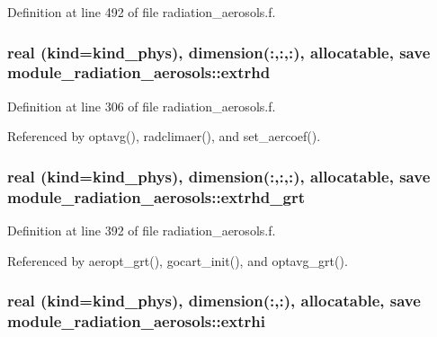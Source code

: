 Definition at line 492 of file radiation\+\_\+aerosols.\+f.

\subsubsection[{\texorpdfstring{extrhd}{extrhd}}]{\setlength{\rightskip}{0pt plus 5cm}real (kind=kind\+\_\+phys), dimension(\+:,\+:,\+:), allocatable, save module\+\_\+radiation\+\_\+aerosols\+::extrhd\hspace{0.3cm}{\ttfamily [private]}}\hypertarget{group__module__radiation__aerosols_ga1c69f7b8ff0c98252e94def83dabfed4}{}\label{group__module__radiation__aerosols_ga1c69f7b8ff0c98252e94def83dabfed4}


Definition at line 306 of file radiation\+\_\+aerosols.\+f.



Referenced by optavg(), radclimaer(), and set\+\_\+aercoef().

\subsubsection[{\texorpdfstring{extrhd\+\_\+grt}{extrhd_grt}}]{\setlength{\rightskip}{0pt plus 5cm}real (kind=kind\+\_\+phys), dimension(\+:,\+:,\+:), allocatable, save module\+\_\+radiation\+\_\+aerosols\+::extrhd\+\_\+grt\hspace{0.3cm}{\ttfamily [private]}}\hypertarget{group__module__radiation__aerosols_ga07bfe1ada075519d1d3ceabe21b65a96}{}\label{group__module__radiation__aerosols_ga07bfe1ada075519d1d3ceabe21b65a96}


Definition at line 392 of file radiation\+\_\+aerosols.\+f.



Referenced by aeropt\+\_\+grt(), gocart\+\_\+init(), and optavg\+\_\+grt().

\subsubsection[{\texorpdfstring{extrhi}{extrhi}}]{\setlength{\rightskip}{0pt plus 5cm}real (kind=kind\+\_\+phys), dimension(\+:,\+:), allocatable, save module\+\_\+radiation\+\_\+aerosols\+::extrhi\hspace{0.3cm}{\ttfamily [private]}}\hypertarget{group__module__radiation__aerosols_ga40447f925f01790155c4d98ff8b0c04d}{}\label{group__module__radiation__aerosols_ga40447f925f01790155c4d98ff8b0c04d}


